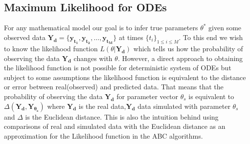 \subsection{Maximum Likelihood for ODEs}
\label{sec:likelihood}
For any mathematical model our goal is to infer true parameters $\theta^*$ given some observed data $\mathbf{Y_{d}} =\{\mathbf{y_{t_1}}, \mathbf{y_{t_2}}, \dots, \mathbf{y_{t_M}}\}$ at times $\{t_{i}\}_{1 \le i \le M}$. To this end we wish to know the likelihood function $L(\theta | \mathbf{Y_{d}})$ which tells us how the probability of observing the data $\mathbf{Y_{d}}$ changes with $\theta$. However, a direct approach to obtaining the likelihood function is not possible for deterministic system of ODEs but subject to some assumptions the likelihood function is equivalent to the distance or error between real(observed) and predicted data. That means that the probability of observing the data $\mathbf{Y_{d}}$ for parameter vector $\theta_{s}$ is equivalent to $\Delta(\mathbf{Y_{d}}, \mathbf{Y_{\theta_s}})$ where $\mathbf{Y_{d}}$ is the real data,$\mathbf{Y_{d}}$ data simulated with parameter $\theta_{s}$ and $\Delta$ is the Euclidean distance. This is also the intuition behind using comparisons of real and simulated data with the Euclidean distance as an approximation for the Likelihood function in the ABC algorithms. 

